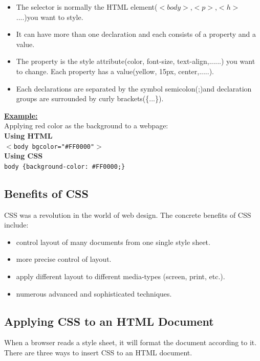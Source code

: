 \documentclass[11pt,a4paper]{article}
\begin{document}
\begin{itemize}
\item The selector is normally the HTML element($<body>$,$<p>$,$<h>$....)you want to style.
\item It can have more than one declaration and each consists of a property and a value.
\item The property is the style attribute(color, font-size, text-align,......) you want to change. Each property has a value(yellow, 15px, center,.....).
\item  Each declarations are separated by the symbol semicolon(;)and declaration groups are surrounded by curly brackets(\{...\}).
\end{itemize}
\underline{\textbf{Example:}}\\

Applying red color as the background to a webpage:\\

\textbf{Using HTML}\\
 
\hspace{1cm} \texttt{$<$body bgcolor="\#FF0000"$>$}\\
	
\textbf{Using CSS}\\

\hspace{1cm}\texttt{body \{background-color: \#FF0000;\}}

\subsection*{Benefits of CSS}
CSS was a revolution in the world of web design. The concrete benefits of CSS include:
\begin{itemize}
\item control layout of many documents from one single style sheet.
\item more precise control of layout.
\item apply different layout to different media-types (screen, print, etc.).
\item numerous advanced and sophisticated techniques.
\end{itemize}

\subsection*{Applying CSS to an HTML Document}
When a browser reads a style sheet, it will format the document according to it. There are three ways to insert CSS to an HTML document.
\end{document}
